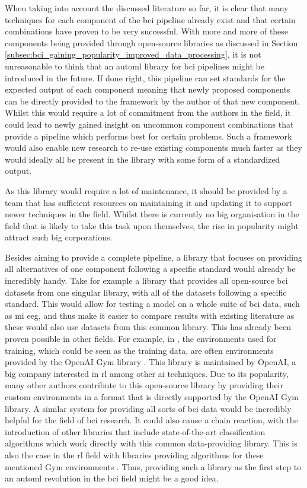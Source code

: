 When taking into account the discussed literature so far, it is clear that many techniques for each component of the \gls{bci} pipeline already exist and that certain combinations have proven to be very successful.
With more and more of these components being provided through open-source libraries as discussed in Section \ref{subsec:bci_gaining_popularity_improved_data_processing}, it is not unreasonable to think that an \gls{automl} library for \gls{bci} pipelines might be introduced in the future.
If done right, this pipeline can set standards for the expected output of each component meaning that newly proposed components can be directly provided to the framework by the author of that new component.
Whilst this would require a lot of commitment from the authors in the field, it could lead to newly gained insight on uncommon component combinations that provide a pipeline which performs best for certain problems.
Such a framework would also enable new research to re-use existing components much faster as they would ideally all be present in the library with some form of a standardized output.

As this library would require a lot of maintenance, it should be provided by a team that has sufficient resources on maintaining it and updating it to support newer techniques in the field.
Whilst there is currently no big organisation in the field that is likely to take this task upon themselves, the rise in popularity might attract such big corporations.

Besides aiming to provide a complete pipeline, a library that focuses on providing all alternatives of one component following a specific standard would already be incredibly handy.
Take for example a library that provides all open-source \gls{bci} datasets from one singular library, with all of the datasets following a specific standard.
This would allow for testing a model on a whole suite of \gls{bci} data, such as \gls{mi} \gls{eeg}, and thus make it easier to compare results with existing literature as these would also use datasets from this common library.
This has already been proven possible in other fields.
For example, in , the environments used for training, which could be seen as the training data, are often environments provided by the OpenAI Gym library \citep{gym}.
This library is maintained by OpenAI, a big company interested in \gls{rl} among other \gls{ai} techniques.
Due to its popularity, many other authors contribute to this open-source library by providing their custom environments in a format that is directly supported by the OpenAI Gym library.
A similar system for providing all sorts of \gls{bci} data would be incredibly helpful for the field of \gls{bci} research.
It could also cause a chain reaction, with the introduction of other libraries that include state-of-the-art classification algorithms which work directly with this common data-providing library.
This is also the case in the \gls{rl} field with libraries providing algorithms for these mentioned Gym environments \citep{tianshou, rllib}.
Thus, providing such a library as the first step to an \gls{automl} revolution in the \gls{bci} field might be a good idea.




